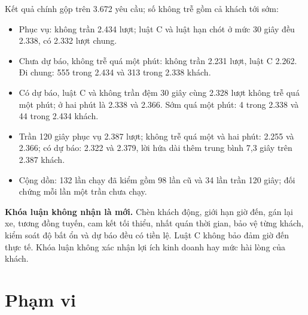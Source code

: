 Kết quả chính gộp trên 3.672 yêu cầu; số không trễ gồm cả khách tới sớm:
\begin{itemize}[leftmargin=0.7cm,itemsep=2pt,topsep=3pt]
\item Phục vụ: không trần 2.434 lượt; luật C và luật hạn chót ở mức 30 giây đều 2.338, có 2.332 lượt chung.
\item Chưa dự báo, không trễ quá một phút: không trần 2.231 lượt, luật C 2.262. Đi chung: 555 trong 2.434
và 313 trong 2.338 khách.
\item Có dự báo, luật C và không trần đệm 30 giây cùng 2.328 lượt không trễ quá một phút; ở hai phút là
2.338 và 2.366. Sớm quá một phút: 4 trong 2.338 và 44 trong 2.434 khách.
\item Trần 120 giây phục vụ 2.387 lượt; không trễ quá một và hai phút: 2.255 và 2.366; có dự báo: 2.322 và
2.379, lời hứa dài thêm trung bình 7,3 giây trên 2.387 khách.
\item Cộng dồn: 132 lần chạy đã kiểm gồm 98 lần cũ và 34 lần trần 120 giây; đối chứng mỗi lần một trần chưa chạy.
\end{itemize}

\begin{khungy}
\textbf{Khóa luận không nhận là mới.}
Chèn khách động, giới hạn giờ đến, gán lại xe, tương đồng tuyến, cam kết tối thiểu, nhất quán thời gian, bảo vệ
từng khách, kiểm soát độ bất ổn và dự báo đều có tiền lệ. Luật C không bảo đảm giờ đến thực tế. Khóa luận
không xác nhận lợi ích kinh doanh hay mức hài lòng của khách.
\end{khungy}

\section{Phạm vi}
\label{muc:c1-phamvi}

